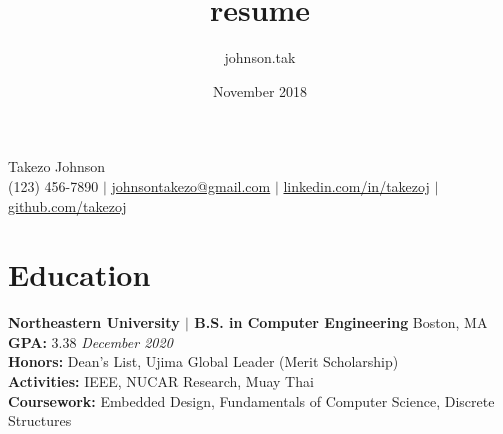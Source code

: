 \documentclass{article}
\title{resume}
\author{johnson.tak }
\date{November 2018}
\newcommand\HUGE{\fontsize{28}{48}\selectfont}
\begin{document}
\thispagestyle{empty}

\titleformat{\section}{\Large}{}{0em}{}{}
\titleformat{\subsection}{}{}{0em}{}{}

\renewcommand{\maketitle}{
\begin{center}
{\HUGE Takezo Johnson}\\
\vspace{.25em}
\faMobilePhone{ }(123) 456-7890 $\mid$ 
\href{mailto:johnsontakezo@gmail.com}{\faSend{ }johnsontakezo@gmail.com} $\mid$ 
\href{https://www.linkedin.com/in/takezoj}{\faLinkedinSquare{ }linkedin.com/in/takezoj} $\mid$ 
\href{https://www.github.com/takezoj}{\faGithub{ }github.com/takezoj}
\end{center}}

\newenvironment{myitemize}
{ \begin{itemize}
    \setlength{\itemsep}{0pt}
    \setlength{\parskip}{0pt}
    \setlength{\parsep}{0pt}     }
{ \end{itemize}                  } 

\maketitle

\section[Education \hfill]{Education \sout{\hfill}}
    {\bfseries\large Northeastern University $\mid$ B.S. in Computer Engineering} \hfill Boston, MA\\
    {\bfseries GPA:} 3.38 \hfill\textit{December 2020}\\
    {\bfseries Honors:} Dean's List, Ujima Global Leader (Merit Scholarship)\\
    {\bfseries Activities:} IEEE, NUCAR Research, Muay Thai\\
    {\bfseries Coursework:} Embedded Design, Fundamentals of Computer Science, Discrete Structures%
\end{document}
